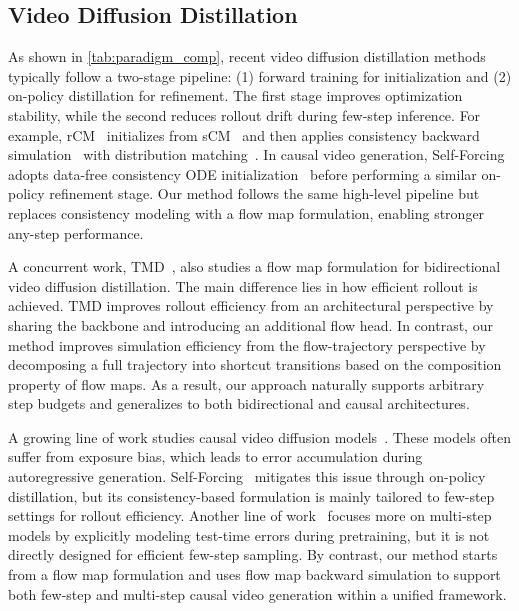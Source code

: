 \subsection{Video Diffusion Distillation}
As shown in \cref{tab:paradigm_comp}, recent video diffusion distillation methods typically follow a two-stage pipeline: (1) forward training for initialization and (2) on-policy distillation for refinement. The first stage improves optimization stability, while the second reduces rollout drift during few-step inference. For example, rCM~\cite{zheng2025large} initializes from sCM~\cite{lu2024simplifying} and then applies consistency backward simulation~\cite{yin2024improved} with distribution matching~\cite{yin2024one}. In causal video generation, Self-Forcing~\cite{huang2025selfforcing} adopts data-free consistency ODE initialization~\cite{yin2025causvid} before performing a similar on-policy refinement stage. Our method follows the same high-level pipeline but replaces consistency modeling with
a flow map formulation, enabling stronger any-step performance.

A concurrent work, TMD~\cite{nie2026transition}, also studies a flow map formulation for bidirectional video diffusion distillation. The main difference lies in how efficient rollout is achieved. TMD improves rollout efficiency from an architectural perspective by sharing the backbone and introducing an additional flow head. In contrast, our method improves simulation efficiency from the flow-trajectory perspective by decomposing a full trajectory into shortcut transitions based on the composition property of flow maps. As a result, our approach naturally supports arbitrary step budgets and generalizes to both bidirectional and causal architectures.

 A growing line of work studies causal video diffusion models~\cite{yang2025longlive, jinpyramidal,zhang2025framepack,songhistory}. These models often suffer from exposure bias, which leads to error accumulation during autoregressive generation. Self-Forcing~\cite{huang2025selfforcing} mitigates this issue through on-policy distillation, but its consistency-based formulation is mainly tailored to few-step settings for rollout efficiency. Another line of work~\cite{guo2025end} focuses more on multi-step models by explicitly modeling test-time errors during pretraining, but it is not directly designed for efficient few-step sampling. By contrast, our method starts from a flow map formulation and uses flow map backward simulation to support both few-step and multi-step causal video generation within a unified framework.


